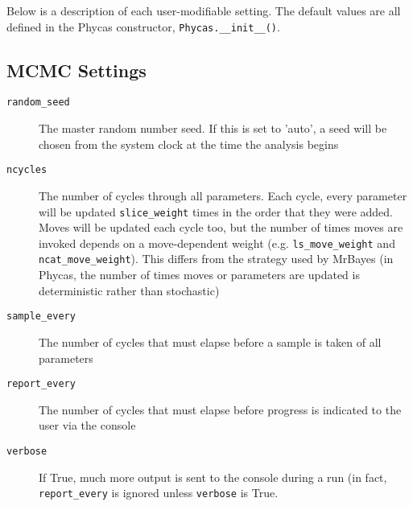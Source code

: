 \documentclass[10pt]{article}
\begin{document}
Below is a description of each user-modifiable setting. The default values are all defined in the Phycas constructor, \verb+Phycas.__init__()+.


\subsection{MCMC Settings}
\begin{description}
\item[{\tt random\_seed}] The master random number seed. If this is set to 'auto', a seed will be chosen from the system clock at the time the analysis begins
\item[{\tt ncycles}] The number of cycles through all parameters. Each cycle, every parameter will be updated \verb+slice_weight+ times in the order that they were added. Moves will be updated each cycle too, but the number of times moves are invoked depends on a move-dependent weight (e.g. \verb+ls_move_weight+ and \verb+ncat_move_weight+). This differs from the strategy used by MrBayes (in Phycas, the number of times moves or parameters are updated is deterministic rather than stochastic)
\item[{\tt sample\_every}] The number of cycles that must elapse before a sample is taken of all parameters
\item[{\tt report\_every}] The number of cycles that must elapse before progress is indicated to the user via the console
\item[{\tt verbose}] If True, much more output is sent to the console during a run (in fact, \verb+report_every+ is ignored unless \verb+verbose+ is True.
\end{description}
\end{document}
